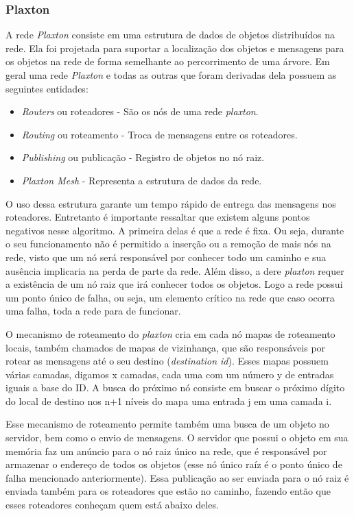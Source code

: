 \subsubsection{Plaxton}

A rede \emph{Plaxton} consiste em uma estrutura de dados de objetos distribuídos na rede. Ela foi projetada para suportar a localização dos objetos e mensagens para os objetos na rede de forma semelhante ao percorrimento de uma árvore. Em geral uma rede \emph{Plaxton} e todas as outras que foram derivadas dela possuem as seguintes entidades:
\begin{itemize}
	\item \emph{Routers} ou roteadores - São os nós de uma rede \emph{plaxton}.
	\item \emph{Routing} ou roteamento - Troca de mensagens entre os roteadores.
	\item \emph{Publishing} ou publicação - Registro de objetos no nó raiz.
	\item \emph{Plaxton Mesh} - Representa a estrutura de dados da rede.
\end{itemize}

O uso dessa estrutura garante um tempo rápido de entrega das mensagens nos roteadores. Entretanto é importante ressaltar que existem alguns pontos negativos nesse algoritmo. A primeira delas é que a rede é fixa. Ou seja, durante o seu funcionamento não é permitido a inserção ou a remoção de mais nós na rede, visto que um nó será responsável por conhecer todo um caminho e sua ausência implicaria na perda de parte da rede. Além disso, a dere \emph{plaxton} requer a existência de um nó raiz que irá conhecer todos os objetos. Logo a rede possui um ponto único de falha, ou seja, um elemento crítico na rede que caso ocorra uma falha, toda a rede para de funcionar.

O mecanismo de roteamento do \emph{plaxton} cria em cada nó mapas de roteamento locais, também chamados de mapas de vizinhança, que são responsáveis por rotear as mensagens até o seu destino (\emph{destination id}). Esses mapas possuem várias camadas, digamos x camadas, cada uma com um número y de entradas iguais a base do ID. A busca do próximo nó consiste em buscar o próximo dígito do local de destino nos n+1 níveis do mapa uma entrada j em uma camada i.

Esse mecanismo de roteamento permite também uma busca de um objeto no servidor, bem como o envio de mensagens. O servidor que possui o objeto em sua memória faz um anúncio para o nó raiz único na rede, que é responsável por armazenar o endereço de todos os objetos (esse nó único raíz é o ponto único de falha mencionado anteriormente). Essa publicação ao ser enviada para o nó raiz é enviada também para os roteadores que estão no caminho, fazendo então que esses roteadores conheçam quem está abaixo deles.

